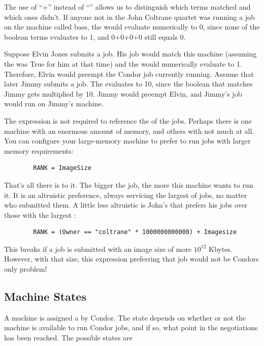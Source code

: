 The use of ``+'' instead of ``\Bar\Bar'' allows us to 
distinguish which terms matched and which ones didn't.
If anyone not in the John Coltrane quartet was running a job on
the machine called bass,
the  would evaluate numerically to 0, since none
of the boolean terms evaluates to 1, and 0+0+0+0 still equals 0.

Suppose Elvin Jones submits a job.
His job would match this
machine (assuming the  was True for him at that time) and
the  would numerically evaluate to 1.
Therefore, Elvin would preempt the Condor job currently running.
Assume that later Jimmy submits a job.
The  evaluates to 10, since the boolean that matches Jimmy
gets multiplied by 10.
Jimmy would preempt Elvin, and Jimmy's job would run on
Jimmy's machine.

The  expression is not required to reference the
 of the jobs.
Perhaps there is one machine with an enormous amount of memory,
and others with not much at all.
You can configure your
large-memory machine to prefer to run jobs with larger memory
requirements:
\begin{verbatim}
        RANK = ImageSize
\end{verbatim}

That's all there is to it.
The bigger the job, the more this machine
wants to run it.
It is an altruistic preference, always servicing
the largest of jobs, no matter who submitted them.
A little less altruistic is John's  that
prefers his jobs over those with the largest
:
\begin{verbatim}
        RANK = (Owner == "coltrane" * 1000000000000) + Imagesize
\end{verbatim}
This  breaks if a job is submitted with an image
size of more $10^{12}$ Kbytes.
However, with that size, this  expression
preferring that job would not be Condors
only problem! 

\subsection{\label{sec:States}
Machine States}

A machine is assigned a  by Condor.
The state
depends on whether or not the machine is available to run Condor
jobs, and if so, what point in the negotiations has been reached.
The possible states are

